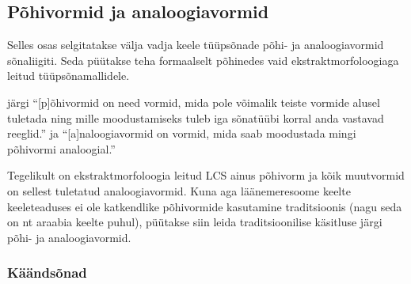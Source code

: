 \documentclass[12pt,a4paper]{article}
\newcommand{\vadja}[1]{\textit{#1}}
\begin{document}
% 
% 



\subsection{Põhivormid ja analoogiavormid}

Selles osas selgitatakse välja vadja keele tüüpsõnade põhi- ja analoogiavormid sõnaliigiti. Seda püütakse teha formaalselt põhinedes vaid ekstrakt\-morfoloogiaga leitud tüüpsõnamallidele.

\cite{erelt_eesti_2007} järgi ``[p]õhivormid on need vormid, mida pole võimalik teiste vormide alusel tuletada ning mille moodustamiseks tuleb iga sõnatüübi korral anda vastavad reeglid.'' ja ``[a]naloogiavormid on vormid, mida saab moodustada mingi põhivormi analoogial.''

Tegelikult on ekstraktmorfoloogia leitud LCS ainus põhivorm ja kõik muutvormid on sellest tuletatud analoogiavormid. Kuna aga läänemeresoome keelte keeleteaduses ei ole katkendlike põhivormide kasutamine traditsioonis (nagu seda on nt araabia keelte puhul), püütakse siin leida traditsioonilise käsitluse järgi põhi- ja analoogiavormid.

\subsubsection{Käändsõnad}
\end{document}
